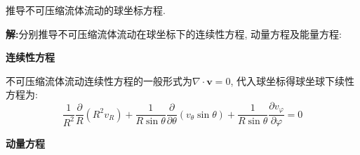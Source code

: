 \begin{problem}[问题3.3]
推导不可压缩流体流动的球坐标方程.
\end{problem}
\begin{solution}
\textbf{解:}分别推导不可压缩流体流动在球坐标下的连续性方程, 动量方程及能量方程:

\vspace{5pt}
\noindent\textbf{连续性方程}
\vspace{5pt}

\noindent 不可压缩流体流动连续性方程的一般形式为$\nabla\cdot\mathbf{v} = 0$, 代入球坐标得球坐球下续性方程为:
\[
\frac{1}{R^2}\frac{\partial}{R}(R^2v_R) + \frac{1}{R\sin\theta}\frac{\partial}{\partial\theta}(v_\theta\sin\theta) + \frac{1}{R\sin\theta}\frac{\partial v_\varphi}{\partial\varphi} = 0
\]

\vspace{5pt}
\noindent\textbf{动量方程}
\vspace{5pt}


\end{solution}
